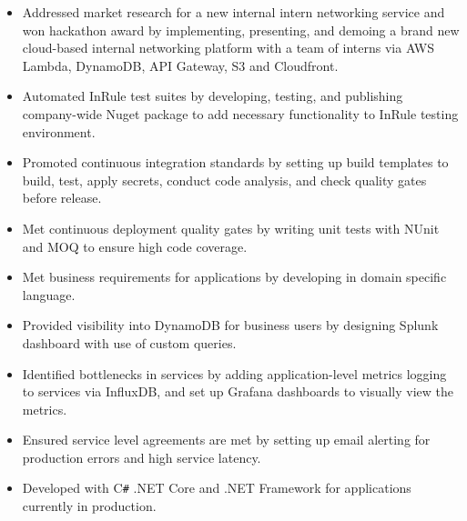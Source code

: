 \documentclass[overlapped]{res}
\begin{document}
\begin{resume}
\begin{itemize}
                  \item Addressed market research for a new internal intern networking service
                  and won hackathon award
                  by implementing, presenting, and demoing 
                  a brand new cloud-based internal
                  networking platform with a team of interns via
                  AWS Lambda, DynamoDB, API Gateway, S3 and Cloudfront.

                  \item Automated InRule test suites by developing, testing, and publishing
                  company-wide Nuget package to add
                  necessary functionality to InRule testing environment.

                  \item Promoted continuous integration standards by setting up build templates to build,
                  test, apply secrets, conduct code analysis,
                  and check quality gates before release.

                  \item Met continuous deployment quality gates by writing unit tests
                  with NUnit and MOQ to ensure high code coverage.


                  \item Met business requirements for applications by developing in domain
                  specific language.

                  \item Provided visibility into DynamoDB for business users
                  by designing Splunk dashboard with use of
                  custom queries.

                  \item Identified bottlenecks in services by adding application-level
                  metrics logging to services via InfluxDB,
                  and set up Grafana dashboards to visually view the metrics.

                  \item Ensured service level agreements are met by setting up email alerting 
                  for production errors and high service latency.

                  \item Developed with C\texttt{\#} .NET Core and .NET Framework
                  for applications currently in production.


\end{itemize}
\end{resume}
\end{document}
